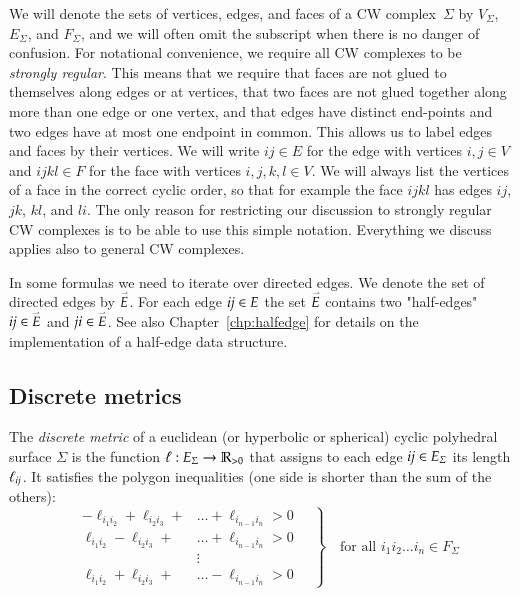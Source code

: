 \documentclass[Thesis]{subfiles}
\begin{document}
We will denote the sets of vertices, edges, and faces of a CW complex~$\Sigma$ by $V_{\Sigma}$, $E_{\Sigma}$, and $F_{\Sigma}$, and we will often omit the subscript when there is no danger of confusion.
For notational convenience, we require all CW complexes to be \emph{strongly regular}. 
This means that we require that faces are not glued to themselves along edges or at vertices, that two faces are not glued together along more than one edge or one vertex, and that edges have distinct end-points and two edges have at most one endpoint in common. 
This allows us to label edges and faces by their vertices. 
We will write $\mathit{ij}\in E$ for the edge with vertices $i,j\in V$ and $\mathit{ijkl}\in F$ for the face with vertices $i,j,k,l\in V$. 
We will always list the vertices of a face in the correct cyclic order, so that for example the face $\mathit{ijkl}$ has edges $\mathit{ij}$, $\mathit{jk}$, $\mathit{kl}$, and $\mathit{li}$.
The only reason for restricting our discussion to strongly regular CW complexes is to be able to use this simple notation. 
Everything we discuss applies also to general CW complexes.

In some formulas we need to iterate over directed edges. 
We denote the set of directed edges by $\accentset{\rightharpoonup}{E}$. 
For each edge $\it ij\in E$ the set $\accentset{\rightharpoonup}{E}$ contains two "half-edges" $\it ij\in \accentset{\rightharpoonup}{E}$ and $\it ji \in \accentset{\rightharpoonup}{E}$.
See also Chapter~\ref{chp:halfedge} for details on the implementation of a half-edge data structure.

\subsection{Discrete metrics}
\label{sec:discrete-metrics}

The \emph{discrete metric} of a euclidean (or hyperbolic or spherical) cyclic polyhedral surface $\Sigma$ is the function $\ell:E_{\Sigma}\rightarrow\mathbb R_{>0}$ that assigns to each edge $\it ij \in E_{\Sigma}$ its
length $\ell_{\it ij}$. 
It satisfies the polygon inequalities (one side is shorter than the sum of the others):
\begin{equation}
\label{eq:polygon_ineq}
\left.
\quad
\begin{aligned}
-\ell_{i_{1}i_{2}}+\ell_{i_{2}i_{3}}+&\ldots+\ell_{i_{n-1}i_{n}}
>0\\
\ell_{i_{1}i_{2}}-\ell_{i_{2}i_{3}}+&\ldots+\ell_{i_{n-1}i_{n}}
>0\\
&\vdots\\
\ell_{i_{1}i_{2}}+\ell_{i_{2}i_{3}}+&\ldots-\ell_{i_{n-1}i_{n}}
>0
\end{aligned}
\quad
\right\}
\quad
\text{for all $i_{1}i_{2}\ldots i_{n}\in F_{\Sigma}$}
\end{equation}
\end{document}
